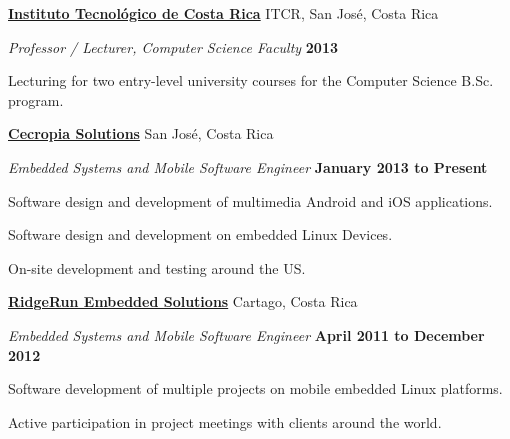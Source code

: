 \documentclass[10pt]{article}
\newenvironment{outerlist}[1][\enskip\textbullet]%
        {\begin{itemize}[#1]}{\end{itemize}%
         \vspace{-0.9\baselineskip}}
\newenvironment{innerlist}[1][\enskip\textbullet]%
        {\begin{compactitem}[#1]}{\end{compactitem}}
\begin{document}
\href{http://www.tec.cr/}{\textbf{Instituto Tecnol\'{o}gico de Costa Rica}} ITCR,
San Jos\'{e}, Costa Rica
\begin{outerlist}

	\item[] \textit{Professor / Lecturer, Computer Science Faculty}%
		\hfill \textbf{2013} 
			\begin{innerlist}
			\item Lecturing for two entry-level university courses for the Computer Science B.Sc. program.\\
			\end{innerlist}

\end{outerlist}

\href{http://www.cecropiasolutions.com/}{\textbf{Cecropia Solutions}}
San Jos\'{e}, Costa Rica
\begin{outerlist}

	\item[] \textit{Embedded Systems and Mobile Software Engineer}%
		\hfill \textbf{January 2013 to Present} 
			\begin{innerlist}
			\item Software design and development of multimedia Android and iOS applications.
			\item Software design and development on embedded Linux Devices.
			\item On-site development and testing around the US.\\
			\end{innerlist}

\end{outerlist}
\href{http://www.ridgerun.com/}{\textbf{RidgeRun Embedded Solutions}}
Cartago, Costa Rica
\begin{outerlist}

	\item[] \textit{Embedded Systems and Mobile Software Engineer}%
		\hfill \textbf{April 2011 to December 2012} 
			\begin{innerlist}
			\item Software development of multiple projects on mobile embedded Linux platforms.
			\item Active participation in project meetings with clients around the world.\\
			\end{innerlist}

\end{outerlist}
\pagebreak
\end{document}
